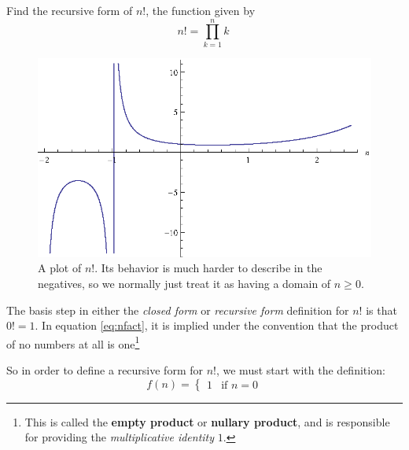 \begin{ex}
  Find the recursive form of $n!$, the function given by
  \begin{equation}\label{eq:nfact}
   n!=\prod_{k=1}^n k \
  \end{equation}
  \begin{figure}[h]
    \begin{center}
      \includegraphics{discrete/recursion/nfact.eps}
    \end{center}
    \caption{A plot of $n!$. Its behavior is much harder to describe in the
    negatives, so we normally just treat it as having a domain of $n \geq 0$.}
    \label{fig:nfact}
  \end{figure}
  \begin{sol}
    The basis step in either the \emph{closed form} or \emph{recursive form}
    definition for $n!$ is that $0!=1$. In equation \eqref{eq:nfact}, it is implied
    under the convention that the product of no numbers at all is
    one\footnote{This is called the \textbf{empty product} or \textbf{nullary
    product}, and is responsible for providing the \emph{multiplicative
    identity} $1$.}

    So in order to define a recursive form for $n!$, we must start with the
    definition:
    \begin{equation}
      f(n) =
      \begin{cases}
        1 & \text{if }n=0
      \end{cases}
    \end{equation}


\end{sol}
\end{ex}
